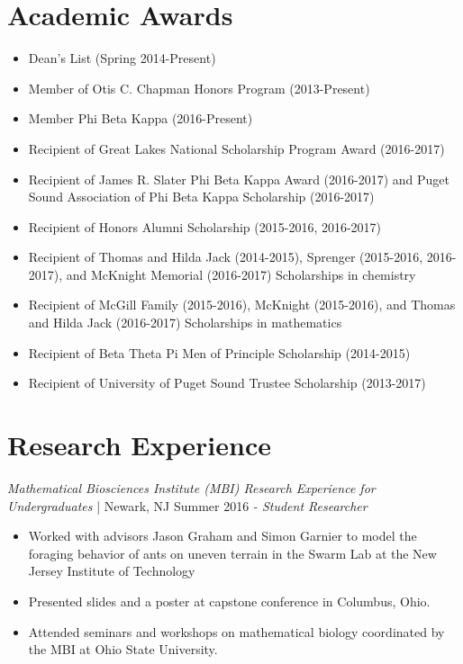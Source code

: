 \documentclass[letter]{res}
\begin{document}
\begin{resume}
\section{Academic Awards} 
 \begin{itemize}
 \item Dean's List (Spring 2014-Present)
 \item Member of Otis C. Chapman Honors Program (2013-Present)
 \item Member Phi Beta Kappa (2016-Present)
 \item Recipient of Great Lakes National Scholarship Program Award (2016-2017)
 \item Recipient of James R. Slater Phi Beta Kappa Award (2016-2017) and Puget Sound Association of Phi Beta Kappa Scholarship (2016-2017)
 \item Recipient of Honors Alumni Scholarship (2015-2016, 2016-2017)
 \item Recipient of Thomas and Hilda Jack (2014-2015), Sprenger (2015-2016, 2016-2017), and McKnight Memorial (2016-2017) Scholarships in chemistry 
 \item Recipient of McGill Family (2015-2016), McKnight (2015-2016), and Thomas and Hilda Jack (2016-2017) Scholarships in mathematics 
 \item Recipient of Beta Theta Pi Men of Principle Scholarship (2014-2015)
 \item Recipient of University of Puget Sound Trustee Scholarship (2013-2017)
 \end{itemize}
\vspace{-3.5mm}

\section{Research Experience}
\textit{Mathematical Biosciences Institute (MBI) Research Experience for Undergraduates} | Newark, NJ \hfill Summer 2016 \newline 
\textit{- Student Researcher} \\
  \vspace{-4.5mm}
 \begin{itemize}
 \item Worked with advisors Jason Graham and Simon Garnier to model the foraging behavior of ants on uneven terrain in the Swarm Lab at the New Jersey Institute of Technology
 \item Presented slides and a poster at capstone conference in Columbus, Ohio.
 \item Attended seminars and workshops on mathematical biology coordinated by the MBI at Ohio State University.
 \end{itemize}
  \vspace{-3.5mm}


\end{resume}
\end{document}
